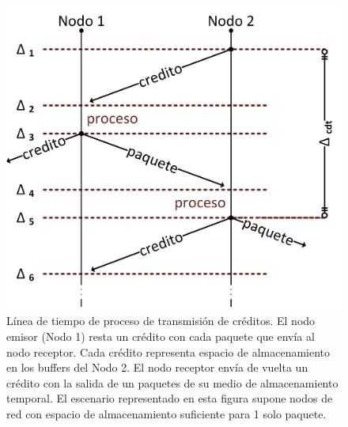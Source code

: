 \begin{figure}
	\begin{center}
		\includegraphics[scale=0.75]{figures/ch2_creditos_timeline.png}
	\end{center}
	\caption
		{	
			Línea de tiempo de proceso de transmisión de créditos. El nodo emisor (Nodo 1) resta un crédito con cada paquete que envía al nodo receptor. Cada crédito representa espacio de almacenamiento en los buffers del Nodo 2. El nodo receptor envía de vuelta un crédito con la salida de un paquetes de su medio de almacenamiento temporal. El escenario representado en esta figura supone nodos de red con espacio de almacenamiento suficiente para 1 solo paquete.
		}
	\label{fig:ch2_creditos_timeline}
\end{figure}

